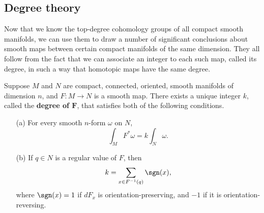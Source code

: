 \subsection{Degree theory}
Now that we know the top-degree cohomology groups of all compact smooth manifolds, we can use them to draw a number of significant conclusions about smooth maps between certain compact manifolds of the same dimension. They all follow from the fact that we can associate an integer to each such map, called its degree, in
such a way that homotopic maps have the same degree.
\begin{theorem}\label{degree def}
Suppose $M$ and $N$ are compact, connected, oriented, smooth manifolds of dimension $n$, and $F:M\to N$ is a smooth map. There exists a unique integer $k$, called the \textbf{degree of $\bm{F}$}, that satisfies both of the following conditions.
\begin{itemize}
\item[(a)] For every smooth $n$-form $\omega$ on $N$,
\[\int_MF^*\omega=k\int_N\omega.\]
\item[(b)] If $q\in N$ is a regular value of $F$, then
\[k=\sum_{x\in F^{-1}(q)}\sgn(x),\]
where $\sgn(x)=1$ if $dF_x$ is orientation-preserving, and $-1$ if it is orientation-reversing.
\end{itemize}
\end{theorem}
